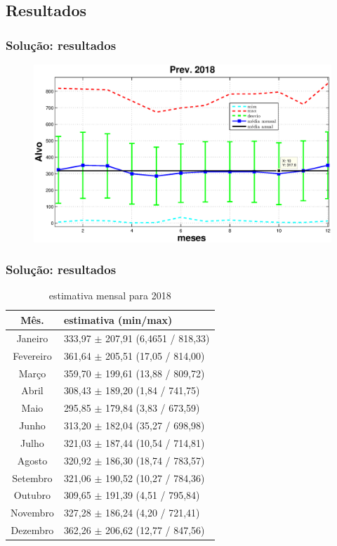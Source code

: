 \documentclass[xcolor=dvipsnames,xcolor=table]{beamer}
\newcommand{\rgn}{\rowcolor[gray]{.9}}
\newcommand{\rgc}{\rowcolor[gray]{.5}}
\begin{document}
\subsection{Resultados}
\begin{frame}\frametitle{Solução: resultados}
\begin{figure}[htpb] \begin{center} 
\includegraphics[width=0.9\columnwidth]{prev1}
\end{center}
\end{figure}
\end{frame}

\begin{frame}\frametitle{Solução: resultados}
\begin{table}[htpb]
\caption{estimativa mensal para 2018}
\begin{tabular}{c|l} 
 Mês. 			& estimativa (min/max) \\ \hline
\rgc Janeiro		& 333,97 $\pm$ 207,91 (6,4651 / 818,33)\\ \hline
\rgn Fevereiro		& 361,64 $\pm$ 205,51 (17,05 / 814,00)\\ \hline
\rgc Março		& 359,70 $\pm$ 199,61 (13,88 / 809,72)\\ \hline
\rgn Abril		& 308,43 $\pm$ 189,20 (1,84 / 741,75)\\ \hline
\rgc Maio		& 295,85 $\pm$ 179,84 (3,83 / 673,59)\\ \hline
\rgn Junho		& 313,20 $\pm$ 182,04 (35,27 / 698,98)\\ \hline
\rgc Julho		& 321,03 $\pm$ 187,44 (10,54 / 714,81)\\ \hline
\rgn Agosto		& 320,92 $\pm$ 186,30 (18,74 / 783,57)\\ \hline
\rgc Setembro		& 321,06 $\pm$ 190,52 (10,27 / 784,36)\\ \hline
\rgn Outubro		& 309,65 $\pm$ 191,39 (4,51 / 795,84)\\ \hline
\rgc Novembro		& 327,28 $\pm$ 186,24 (4,20 / 721,41)\\ \hline
\rgn Dezembro		& 362,26 $\pm$ 206,62 (12,77 / 847,56)\\ 

\end{tabular}
\end{table}

\end{frame}
\end{document}
